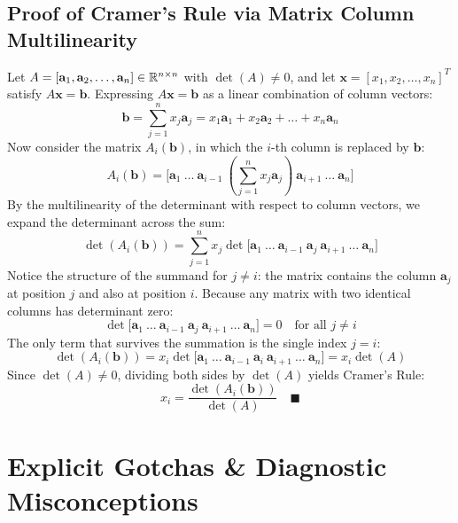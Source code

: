 \subsection{Proof of Cramer's Rule via Matrix Column Multilinearity}
Let $A = [\mathbf{a}_1, \mathbf{a}_2, \dots, \mathbf{a}_n] \in \mathbb{R}^{n \times n}$ with $\det(A) \neq 0$, and let $\mathbf{x} = [x_1, x_2, \dots, x_n]^T$ satisfy $A\mathbf{x} = \mathbf{b}$.
Expressing $A\mathbf{x} = \mathbf{b}$ as a linear combination of column vectors:
\begin{equation}
\mathbf{b} = \sum_{j=1}^n x_j \mathbf{a}_j = x_1 \mathbf{a}_1 + x_2 \mathbf{a}_2 + \dots + x_n \mathbf{a}_n
\end{equation}
Now consider the matrix $A_i(\mathbf{b})$, in which the $i$-th column is replaced by $\mathbf{b}$:
\begin{equation}
A_i(\mathbf{b}) = \Big[ \mathbf{a}_1 \ \dots \ \mathbf{a}_{i-1} \ \left(\sum_{j=1}^n x_j \mathbf{a}_j\right) \ \mathbf{a}_{i+1} \ \dots \ \mathbf{a}_n \Big]
\end{equation}
By the multilinearity of the determinant with respect to column vectors, we expand the determinant across the sum:
\begin{equation}
\det(A_i(\mathbf{b})) = \sum_{j=1}^n x_j \det\Big[ \mathbf{a}_1 \ \dots \ \mathbf{a}_{i-1} \ \mathbf{a}_j \ \mathbf{a}_{i+1} \ \dots \ \mathbf{a}_n \Big]
\end{equation}
Notice the structure of the summand for $j \neq i$: the matrix contains the column $\mathbf{a}_j$ at position $j$ and also at position $i$. 
Because any matrix with two identical columns has determinant zero:
\begin{equation}
\det\Big[ \mathbf{a}_1 \ \dots \ \mathbf{a}_{i-1} \ \mathbf{a}_j \ \mathbf{a}_{i+1} \ \dots \ \mathbf{a}_n \Big] = 0 \quad \text{for all } j \neq i
\end{equation}
The only term that survives the summation is the single index $j = i$:
\begin{equation}
\det(A_i(\mathbf{b})) = x_i \det\Big[ \mathbf{a}_1 \ \dots \ \mathbf{a}_{i-1} \ \mathbf{a}_i \ \mathbf{a}_{i+1} \ \dots \ \mathbf{a}_n \Big] = x_i \det(A)
\end{equation}
Since $\det(A) \neq 0$, dividing both sides by $\det(A)$ yields Cramer's Rule:
\begin{equation}
x_i = \frac{\det(A_i(\mathbf{b}))}{\det(A)} \quad \blacksquare
\end{equation}

\section{Explicit Gotchas \& Diagnostic Misconceptions}

